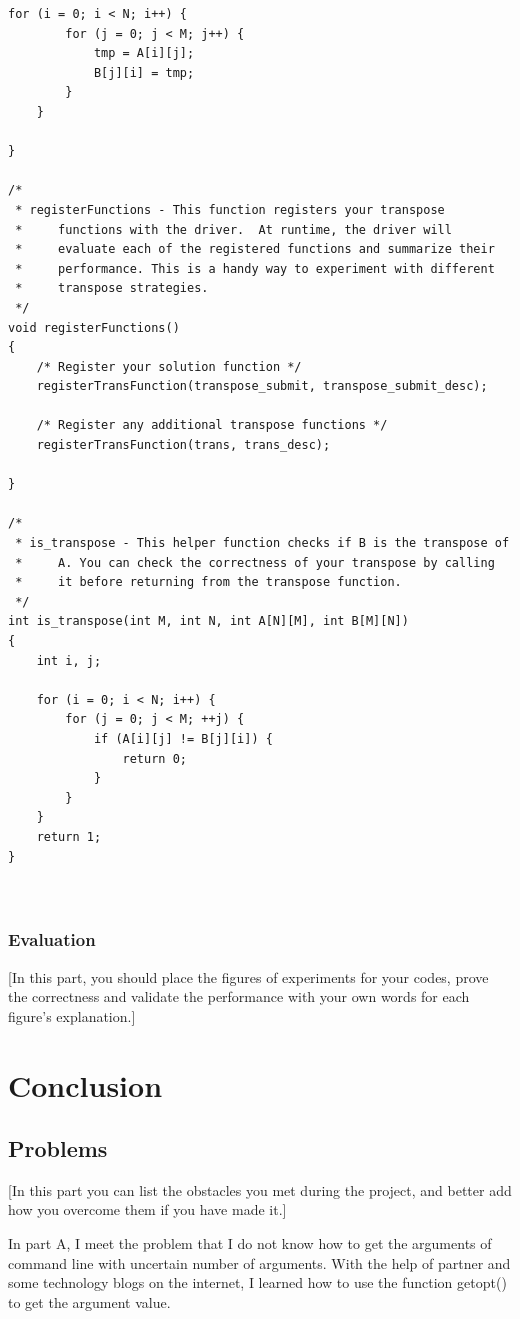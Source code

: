 \documentclass{article}
\begin{document}
\begin{lstlisting}[title=trans.c, frame=shadowbox]
    for (i = 0; i < N; i++) {
        for (j = 0; j < M; j++) {
            tmp = A[i][j];
            B[j][i] = tmp;
        }
    }    

}

/*
 * registerFunctions - This function registers your transpose
 *     functions with the driver.  At runtime, the driver will
 *     evaluate each of the registered functions and summarize their
 *     performance. This is a handy way to experiment with different
 *     transpose strategies.
 */
void registerFunctions()
{
    /* Register your solution function */
    registerTransFunction(transpose_submit, transpose_submit_desc); 

    /* Register any additional transpose functions */
    registerTransFunction(trans, trans_desc); 

}

/* 
 * is_transpose - This helper function checks if B is the transpose of
 *     A. You can check the correctness of your transpose by calling
 *     it before returning from the transpose function.
 */
int is_transpose(int M, int N, int A[N][M], int B[M][N])
{
    int i, j;

    for (i = 0; i < N; i++) {
        for (j = 0; j < M; ++j) {
            if (A[i][j] != B[j][i]) {
                return 0;
            }
        }
    }
    return 1;
}



\end{lstlisting}
\subsubsection{Evaluation}

[In this part, you should place the figures of experiments for your codes, prove the correctness and validate the performance with your own words for each figure’s explanation.]

\section{Conclusion}

\subsection{Problems}

[In this part you can list the obstacles you met during the project, and better add how you overcome them if you have made it.]

In part A, I meet the problem that I do not know how to get the arguments of command line with uncertain number of arguments. With the help of partner and some technology blogs on the internet, I learned how to use the function getopt() to get the argument value.
\end{document}
